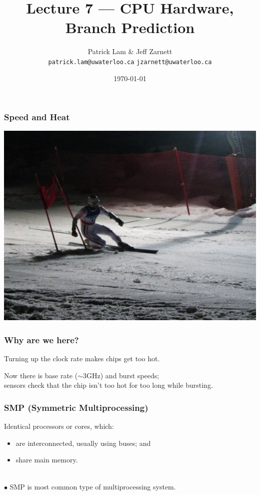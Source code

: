 

\title{Lecture 7 --- CPU Hardware, Branch Prediction }

\author{Patrick Lam \& Jeff Zarnett \\ \small \texttt{patrick.lam@uwaterloo.ca} \texttt{jzarnett@uwaterloo.ca}}
\date{\today}




\begin{frame}
  \titlepage

 \end{frame}

\begin{frame}
  \frametitle{Speed and Heat}
\begin{center}
  \includegraphics[width=\textwidth]{images/5482_around_the_gate-topaz-denoise.jpeg}
\end{center}
\end{frame}

\begin{frame}
  \frametitle{Why are we here?}
    Turning up the clock rate makes chips get too hot.

    Now there is base rate ($\sim$3GHz) and burst speeds;\\
    \qquad sensors check that the chip isn't too hot for too long while bursting.
\end{frame}

\begin{frame}
  \frametitle{SMP (Symmetric Multiprocessing)}

    Identical processors or cores, which:
    \begin{itemize}
    \item are interconnected, usually using buses; and
    \item share main memory.
    \end{itemize}
    ~\\[1em]
    $\bullet$ SMP is most common type of multiprocessing system.

\end{frame}

